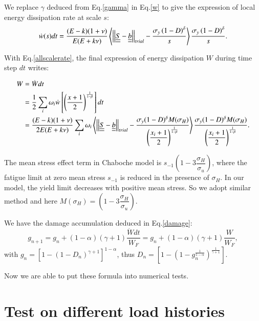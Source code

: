 \documentclass[3p,times,number,review]{elsarticle}
\begin{document}
We replace $\gamma$ deduced from Eq.\eqref{gamma} in Eq.\eqref{w} to give the expression of local energy dissipation rate at scale $s$:
\begin{equation}
\dot{w}(s)dt=\dfrac{(E-k)(1+\nu) }{E(E+k\nu)}\left\langle  \left| \left|\uline{\uline{S}}-\uline{\uline{b}}\right| \right|_{trial}-\dfrac{ \sigma_y\left(1-D\right)^\delta}{s}\right\rangle \dfrac{ \sigma_y\left(1-D\right)^\delta}{s}.
\label{dW}
\end{equation}

With Eq.\eqref{allscalerate}, the final expression of energy dissipation $W$ during time step $dt$ writes:

\begin{equation}
\begin{split}
W&=\dot{W}dt
\\&=\frac{1}{2}\sum_{i}\omega_i\dot{w}\left[  \left( \frac{x+1}{2}\right) ^{\frac{1}{1-\beta}}\right]dt
\\&=\dfrac{(E-k)(1+\nu) }{2E(E+k\nu)}\sum_{i}\omega_i\left\langle  \left| \left|\uline{\uline{S}}-\uline{\uline{b}}\right| \right|_{trial}-\dfrac{\sigma_y(1-D)^\delta M(\sigma_H)}{\left( \dfrac{x_i+1}{2}\right) ^{\frac{1}{1-\beta}}}\right\rangle \dfrac{\sigma_y(1-D)^\delta M(\sigma_H)}{\left( \dfrac{x_i+1}{2}\right)^{\frac{1}{1-\beta}}}.
\end{split}
\label{finaldw}
\end{equation}

The mean stress effect term in Chaboche model is $s_{-1}\left(1-3\dfrac{\sigma_H}{\sigma_u} \right)$, where the fatigue limit at zero mean stress $s_{-1}$ is reduced in the presence of $\sigma_H$. In our model, the yield limit decreases with positive mean stress. So we adopt similar method and here $M(\sigma_H)=\left(1-3\dfrac{\sigma_H}{\sigma_u} \right)$.


We have the damage accumulation deduced in Eq.\eqref{damage}:
$$g_{n+1}=g_n+(1-\alpha)(\gamma+1)\dfrac{\dot{W}dt}{W_F}=g_n+(1-\alpha)(\gamma+1)\dfrac{W}{W_F},$$
with $g_n=\left[ 1-\left( 1-D_{n}\right)^{\gamma+1} \right]^{1-\alpha}$, thus $D_n=\left[1-\left(1-g_n^{\frac{1}{1-\alpha}} \right)^{\frac{1}{\gamma+1}}  \right]$.
 
 Now we are able to put these formula into numerical tests.
 
\section{Test on different load histories}
\end{document}
